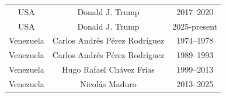 \documentclass{OUP-EJ}
\begin{document}
\begin{table}[h]
{\begin{tabular}{|c|c|c|}
USA          & Donald J. Trump                               & 2017–2020    \\
USA          & Donald J. Trump                               & 2025-present \\
Venezuela    & Carlos Andrés Pérez Rodríguez                 & 1974–1978    \\
Venezuela    & Carlos Andrés Pérez Rodríguez                 & 1989–1993    \\
Venezuela    & Hugo Rafael Chávez Frías                      & 1999–2013    \\
Venezuela    & Nicolás Maduro                                & 2013–2025  \\ \hline
    \end{tabular}%
    }
    \label{List of Populist Leaders}
\end{table}







\end{document}
